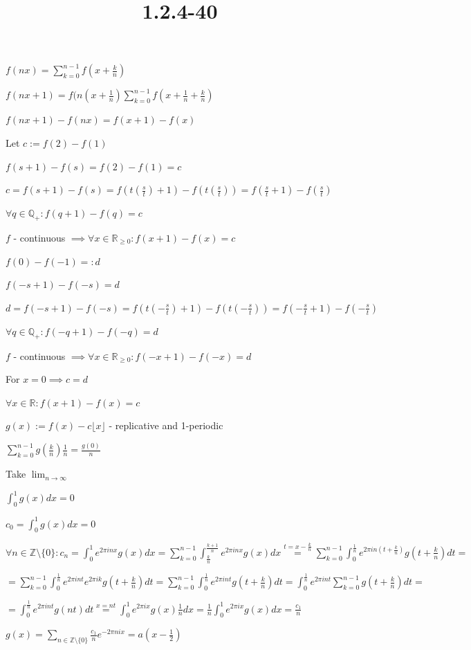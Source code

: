 \documentclass{article}
\title{1.2.4-40}
\begin{document}
\maketitle

\( f(nx) = \sum_{k=0}^{n-1} f(x + \frac{k}{n}) \)

\( f(nx + 1) = f(n(x+\frac{1}{n})\sum_{k=0}^{n-1} f(x + \frac{1}{n} + \frac{k}{n}) \)

\( f(nx+1) - f(nx) = f(x + 1) - f(x) \)

Let \( c := f(2) - f(1) \)

\( f(s+1)-f(s) = f(2) - f(1) = c \)

\( c = f(s+1)-f(s) = f(t(\frac{s}{t}) + 1) - f(t(\frac{s}{t})) = f(\frac{s}{t} + 1) - f(\frac{s}{t}) \)

\( \forall q \in \mathbb{Q_+}: f(q+1) - f(q) = c \)

\( f \) - continuous \( \implies \forall x \in \mathbb{R}_{\geq 0}: f(x+1)-f(x) = c \)

\( f(0) - f(-1) =: d \)

\( f(-s+1) - f(-s) = d \)

\( d = f(-s+1)-f(-s) = f(t(-\frac{s}{t}) + 1) - f(t(-\frac{s}{t})) = f(-\frac{s}{t} + 1) - f(-\frac{s}{t}) \)

\( \forall q \in \mathbb{Q_+}: f(-q+1) - f(-q) = d \)

\( f \) - continuous \( \implies \forall x \in \mathbb{R}_{\geq 0}: f(-x+1)-f(-x) = d \)

For \( x = 0 \implies c = d \)

\( \forall x \in \mathbb{R}: f(x+1) - f(x) = c \)

\( g(x) := f(x) - c \lfloor x \rfloor \) - replicative and 1-periodic

\( \sum_{k=0}^{n-1} g(\frac{k}{n})\frac{1}{n} = \frac{g(0)}{n} \)

Take \( \lim_{n \to \infty} \)

\( \int_0^1 g(x) dx = 0 \)

\( c_0 = \int_0^1 g(x) dx = 0 \)

\( \forall n \in \mathbb{Z} \setminus \{ 0 \}: c_n = \int_0^1 e^{2\pi i n x} g(x) dx = \sum_{k=0}^{n-1} \int_{\frac{k}{n}}^{\frac{k+1}{n}} e^{2\pi i n x} g(x) dx \overset{t = x - \frac{k}{n}}{=} \sum_{k=0}^{n-1} \int_{0}^{\frac{1}{n}} e^{2\pi i n (t + \frac{k}{n})} g(t + \frac{k}{n}) dt = \)

\( = \sum_{k=0}^{n-1} \int_{0}^{\frac{1}{n}} e^{2\pi i n t} e^{2\pi i k} g(t + \frac{k}{n}) dt = \sum_{k=0}^{n-1} \int_{0}^{\frac{1}{n}} e^{2\pi i n t} g(t + \frac{k}{n}) dt = \int_{0}^{\frac{1}{n}}e^{2\pi i n t}\sum_{k=0}^{n-1} g(t + \frac{k}{n}) dt = \)

\( = \int_{0}^{\frac{1}{n}}e^{2\pi i n t} g(nt) dt \overset{x=nt}{=} \int_{0}^{1}e^{2\pi i x} g(x) \frac{1}{n}dx = \frac{1}{n} \int_{0}^{1}e^{2\pi i x} g(x) dx = \frac{c_1}{n} \)

\( g(x) = \sum_{n \in \mathbb{Z} \setminus \{ 0 \}} \frac{c_1}{n} e^{-2\pi n i x} = a(x-\frac{1}{2}) \)
\end{document}
